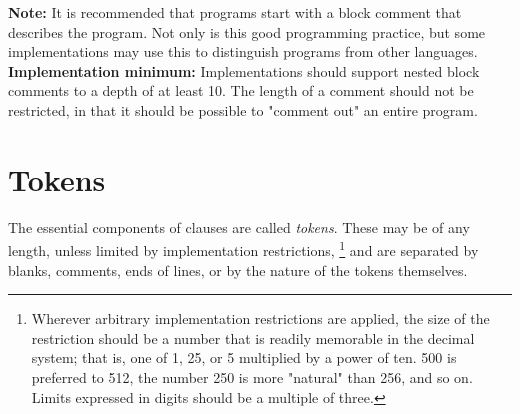 \begin{shaded}\noindent
\textbf{Note: }It is recommended that \crexx{} programs start with a block comment
that describes the program.
Not only is this good programming practice, but some implementations may
use this to distinguish \crexx{} programs from other languages.
 \textbf{Implementation minimum:} Implementations should support
nested block comments to a depth of at least 10.
The length of a comment should not be restricted, in that it should be
possible to "comment out" an entire program.
\end{shaded}\indent
\section{Tokens}\label{reftokens}
 The essential components of clauses are called \emph{tokens}.
These may be of any length, unless limited by implementation
restrictions,
\footnote{
Wherever arbitrary implementation restrictions are applied, the size of
the restriction should be a number that is readily memorable in the
decimal system; that is, one of 1, 25, or 5 multiplied by a power of
ten.
500 is preferred to 512, the number 250 is more "natural" than
256, and so on.  Limits expressed in digits should be a multiple of
three.
}
and are separated by blanks, comments, ends of lines, or by the nature
of the tokens themselves.
 
